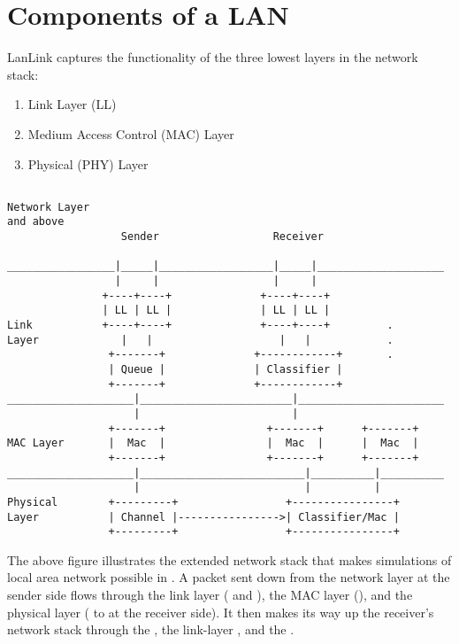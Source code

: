 \section{Components of a LAN}
\label{sec:lan_components}

LanLink captures the functionality of the three lowest layers in the
network stack:

\begin{enumerate}
\item
	Link Layer (LL)
\item
	Medium Access Control (MAC) Layer
\item
	Physical (PHY) Layer
\end{enumerate}


\begin{verbatim}

Network Layer
and above
                  Sender                  Receiver

_________________|_____|__________________|_____|____________________
                 |     |                  |     |
               +----+----+              +----+----+
               | LL | LL |              | LL | LL |
Link           +----+----+              +----+----+         .
Layer             |   |                    |   |            .
                +-------+              +------------+       .
                | Queue |              | Classifier |
                +-------+              +------------+
____________________|________________________|_______________________
                    |                        |
                +-------+                +-------+      +-------+
MAC Layer       |  Mac  |                |  Mac  |      |  Mac  |
                +-------+                +-------+      +-------+
____________________|__________________________|__________|__________
                    |                          |          |
Physical        +---------+                 +----------------+
Layer           | Channel |---------------->| Classifier/Mac |
                +---------+                 +----------------+

\end{verbatim}

The above figure illustrates the extended network stack that makes
simulations of local area network possible in \ns.  A packet sent down
from the network layer at the sender side flows through the link layer
( and ), the MAC layer (), and the
physical layer ( to  at the receiver
side).  It then makes its way up the receiver's network stack through
the , the link-layer , and the .

